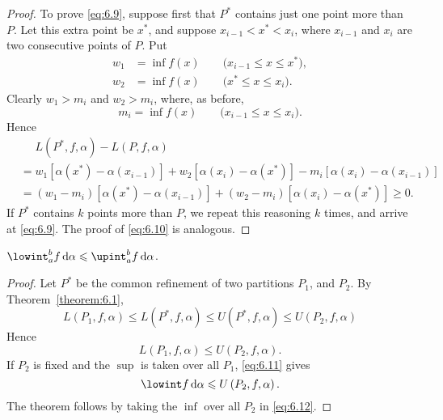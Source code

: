 \begin{proof}
    To prove \eqref{eq:6.9}, suppose first that \(P^*\) contains just one point more than \(P\). Let this extra point be \(x^*\), and suppose \(x_{i-1}<x^*<x_i\), where \(x_{i-1}\) and \(x_i\) are two consecutive points of \(P\). Put
    \begin{align*}
        w_1&=\inf f\left(x\right)\qquad\text{(\(x_{i-1}\leqslant x\leqslant x^*\))},\\
        w_2&=\inf f\left(x\right)\qquad\text{(\(x^*\leqslant x\leqslant x_i\))}.
    \end{align*}
    Clearly \(w_1>m_i\) and \(w_2>m_i\), where, as before,
    \begin{equation*}
        m_i=\inf f\left(x\right)\qquad\text{(\(x_{i-1}\leqslant x\leqslant x_i\))}.
    \end{equation*}
    Hence
    \begin{align*}
        &\phantom{{}={}}L\left(P^*,f,\alpha\right)-L\left(P,f,\alpha\right)\\
        &=w_1\left[\alpha\left(x^*\right)-\alpha\left(x_{i-1}\right)\right]+w_2\left[\alpha\left(x_i\right)-\alpha\left(x^*\right)\right]-m_i\left[\alpha\left(x_i\right)-\alpha\left(x_{i-1}\right)\right]\\
        &=\left(w_1-m_i\right)\left[\alpha\left(x^*\right)-\alpha\left(x_{i-1}\right)\right]+\left(w_2-m_i\right)\left[\alpha\left(x_i\right)-\alpha\left(x^*\right)\right]\geqslant0.
    \end{align*}
    If \(P^*\) contains \(k\) points more than \(P\), we repeat this reasoning \(k\) times, and arrive at \eqref{eq:6.9}. The proof of \eqref{eq:6.10} is analogous.
\end{proof}

\begin{theorem}
    \(\lowint_a^bf\odif{\alpha}\leqslant\upint_a^bf\odif{\alpha}\).
\end{theorem}

\begin{proof}
    Let \(P^*\) be the common refinement of two partitions \(P_1\), and \(P_2\). By Theorem~\ref{theorem:6.1},
    \begin{equation*}
        L\left(P_1,f,\alpha\right)\leqslant L\left(P^*,f,\alpha\right)\leqslant U\left(P^*,f,\alpha\right)\leqslant U\left(P_2,f,\alpha\right)
    \end{equation*}
    Hence
    \begin{equation}
        L\left(P_1,f,\alpha\right)\leqslant U\left(P_2,f,\alpha\right).\label{eq:6.11}
    \end{equation}
    If \(P_2\) is fixed and the \(\sup\) is taken over all \(P_1\), \eqref{eq:6.11} gives
    \begin{equation}
        \lowint f\odif{\alpha}\leqslant U\left(P_2,f,\alpha\right).\label{eq:6.12}
    \end{equation}
    The theorem follows by taking the \(\inf\) over all \(P_2\) in \eqref{eq:6.12}.
\end{proof}

